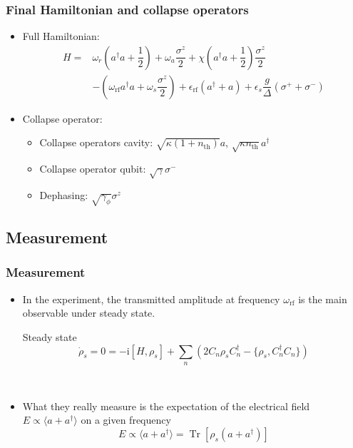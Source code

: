 \documentclass[xcolor=dvipsnames,hyperref={CJKbookmarks=true},aspectratio=169]{beamer}
\newcommand\mi{\mathrm{i}}
\newcommand{\rf}{\text{rf}}
\newcommand{\thm}{\text{th}}
\DeclareMathOperator{\Tr}{Tr}
\begin{document}
\begin{frame}
\frametitle{Final Hamiltonian and collapse operators}
\begin{itemize}
	\item Full Hamiltonian: 
\begin{align*}
H =& \omega_r \left(a^{\dagger} a+ \dfrac{1}{2} \right) +  \omega_a \dfrac{\sigma^{z}}{2}+ \chi \left(a^{\dagger}a+\dfrac{1}{2} \right)\dfrac{\sigma^{z}}{2}\\
& - \left( \omega_{\rf}a^{\dagger}a +\omega_s \dfrac{\sigma^{z}}{2} \right) + \epsilon_{\rf}\left(a^{\dagger}+a\right) 
+  \epsilon_{s}\dfrac{g}{\Delta}\left(\sigma^{+}+\sigma^{-} \right)
\end{align*}
	\item Collapse operator: 
	\begin{itemize}
		\item  Collapse operators cavity: 
		$\sqrt{\kappa \left(1+n_{\thm} \right)}a$, 
		$\sqrt{\kappa n_{\thm} }a^{\dagger}$
		\item Collapse operator qubit:  
		$\sqrt{\gamma}\sigma^{-}$
		\item Dephasing: 
		$\sqrt{\gamma_{\phi}}\sigma^{z}$
	\end{itemize}
\end{itemize}
\end{frame}

\subsection{Measurement}
\begin{frame}[t]\frametitle{Measurement}
	\begin{itemize}
		\item In the experiment, the transmitted amplitude at frequency $\omega_{\rf}$ is the main observable under steady state. 
	\begin{block}{Steady state}
	$$
	\dot\rho_s = 0 = -\mi[H, \rho_{s}] + \sum_n \left(2C_n \rho_s C_n^\dag - 
	\{\rho_s, C_n^\dag C_n\}\right)
	$$
	\end{block}
	~

		\item What they really measure is the expectation of the 
		electrical field $E\propto\langle a + a^\dag \rangle$ \cite{schuster2007circuit} on a given frequency
	$$
	E\propto \langle a + a^\dag \rangle = \Tr [\rho_{s}(a+a^\dag)]
	$$
	\end{itemize}
\end{frame}
\end{document}
